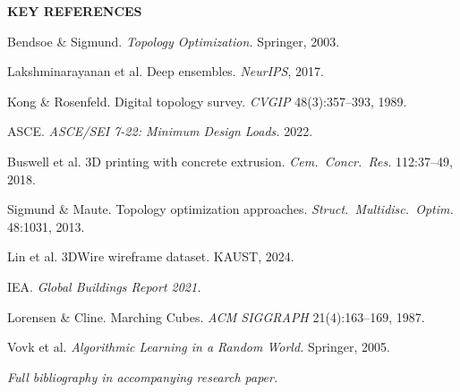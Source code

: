 \documentclass[10pt]{article}
\newenvironment{ccard}{%
  \begin{tcolorbox}[
    colback=cardfill, colframe=cardbdr,
    boxrule=0.5pt, arc=4pt, outer arc=4pt,
    left=3.5mm, right=3.5mm, top=2.5mm, bottom=2.5mm,
    width=\linewidth
  ]%
}{%
  \end{tcolorbox}%
}
\newcommand{\sechdr}[1]{%
  \begin{tcolorbox}[
    colback=secbar, colframe=secbar,
    boxrule=0pt, arc=3pt,
    left=4mm, right=4mm, top=1.5mm, bottom=1.5mm,
    width=\linewidth
  ]
    \centering\color{white}\fontsize{24pt}{26pt}\selectfont\bfseries
    \MakeUppercase{#1}
  \end{tcolorbox}%
  \vspace{1.5mm}%
}
\newlength{\RC}  \setlength{\RC} {29.72cm}
\begin{document}
\begin{minipage}[t]{\RC}
\sechdr{Key References}
\begin{ccard}
  \footnotesize
  \begin{enumerate}[leftmargin=1.4em, itemsep=2pt, topsep=0pt,
    label={[\arabic*]}]
    \item Bendsoe \& Sigmund. \textit{Topology Optimization.} Springer,
      2003.
    \item Lakshminarayanan et al. Deep ensembles. \textit{NeurIPS}, 2017.
    \item Kong \& Rosenfeld. Digital topology survey.
      \textit{CVGIP} 48(3):357--393, 1989.
    \item ASCE. \textit{ASCE/SEI 7-22: Minimum Design Loads.} 2022.
    \item Buswell et al. 3D printing with concrete extrusion.
      \textit{Cem.\ Concr.\ Res.} 112:37--49, 2018.
    \item Sigmund \& Maute. Topology optimization approaches.
      \textit{Struct.\ Multidisc.\ Optim.} 48:1031, 2013.
    \item Lin et al. 3DWire wireframe dataset. KAUST, 2024.
    \item IEA. \textit{Global Buildings Report 2021.}
    \item Lorensen \& Cline. Marching Cubes.
      \textit{ACM SIGGRAPH} 21(4):163--169, 1987.
    \item Vovk et al. \textit{Algorithmic Learning in a Random World.}
      Springer, 2005.
  \end{enumerate}
  \vspace{2mm}
  {\centering\color{posterred}\itshape
    Full bibliography in accompanying research paper.\par}
\end{ccard}

\end{minipage}%
\end{document}
